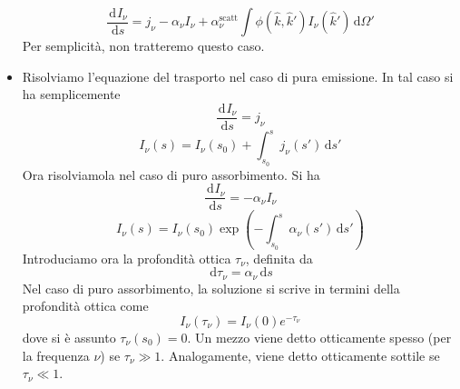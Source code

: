 \documentclass[a4paper,11pt]{article}
\renewcommand{\d}{\mathrm{d}} %
\newcommand{\der}[3][]{\frac{\d ^{#1}#2}{\d {#3}^{#1}}} %
\renewcommand{\d}{\,\mathrm{d}}
\theoremstyle{theorem}
\theoremstyle{definition}
\begin{document}
\begin{itemize}
		\[\der{I_\nu}{s}=j_\nu-\alpha_\nu I_\nu+\alpha_\nu^{\textrm{scatt}}\int\phi(\hat{k},\hat{k}')I_\nu(\hat{k}')\d\Omega'\]
		Per semplicità, non tratteremo questo caso.
		\item Risolviamo l'equazione del trasporto nel caso di pura emissione. In tal caso si ha semplicemente
		\[\der{I_\nu}{s}=j_\nu\]
		\[I_\nu(s)=I_\nu(s_0)+\int_{s_0}^{s}j_\nu(s')\d s'\]
		Ora risolviamola nel caso di puro assorbimento. Si ha
		\[\der{I_\nu}{s}=-\alpha_\nu I_\nu\]
		\[I_\nu(s)=I_\nu(s_0)\exp\left(-\int_{s_0}^{s}\alpha_\nu(s')\d s'\right)\]
		Introduciamo ora la profondità ottica $\tau_\nu$, definita da
		\[\d\tau_\nu=\alpha_\nu \d s\]
		Nel caso di puro assorbimento, la soluzione si scrive in termini della profondità ottica come
		\[I_\nu(\tau_\nu)=I_\nu(0)e^{-\tau_\nu}\]
		dove si è assunto $\tau_\nu(s_0)=0$. Un mezzo viene detto otticamente spesso (per la frequenza $\nu$) se $\tau_\nu\gg 1$. Analogamente, viene detto otticamente sottile se $\tau_\nu\ll1$.
		

\end{itemize}
\end{document}
